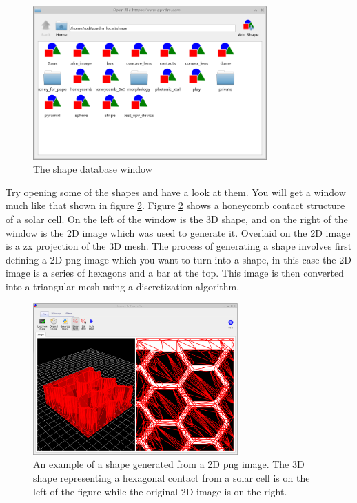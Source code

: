 \begin{figure}[H]
\centering
\includegraphics[width=0.8\textwidth]{./images/database_shapes/shape_db_window.png}
\caption{The shape database window}
\label{fig:shapedb_window}
\end{figure}

Try opening some of the shapes and have a look at them.  You will get a window much like that shown in figure \ref{fig:shapedb_example}. Figure \ref{fig:shapedb_example} shows a honeycomb contact structure of a solar cell.  On the left of the window is the 3D shape, and on the right of the window is the 2D image which was used to generate it.  Overlaid on the 2D image is a zx projection of the 3D mesh. The process of generating a shape involves first defining a 2D png image which you want to turn into a shape, in this case the 2D image is a series of hexagons and a bar at the top.  This image is then converted into a triangular mesh using a discretization algorithm.    

\begin{figure}[H]
\centering
\includegraphics[width=0.7\textwidth,height=0.4\textheight]{./images/database_shapes/shape_db.png}
\caption{An example of a shape generated from a 2D png image. The 3D shape representing a hexagonal contact from a solar cell is on the left of the figure while the original 2D image is on the right.}
\label{fig:shapedb_example}
\end{figure}

